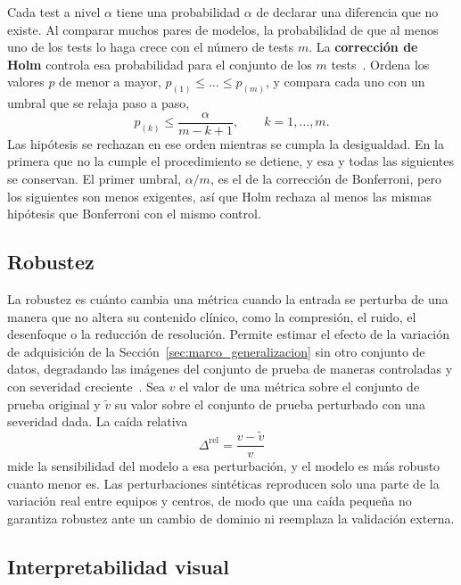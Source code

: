 Cada test a nivel $\alpha$ tiene una probabilidad $\alpha$ de declarar una diferencia que no existe. Al comparar
muchos pares de modelos, la probabilidad de que al menos uno de los tests lo haga crece con el número de tests
$m$. La \textbf{corrección de Holm} controla esa probabilidad para el conjunto de los $m$ tests~\cite{holm1979simple}. Ordena los valores $p$ de menor a mayor, $p_{(1)} \le \dots \le p_{(m)}$, y compara
cada uno con un umbral que se relaja paso a paso,
\begin{equation}
    p_{(k)} \le \frac{\alpha}{m - k + 1}, \qquad k = 1, \dots, m.
    \label{eq:marco_holm}
\end{equation}
Las hipótesis se rechazan en ese orden mientras se cumpla la desigualdad. En la primera que no la cumple el
procedimiento se detiene, y esa y todas las siguientes se conservan. El primer umbral, $\alpha/m$, es el de la
corrección de Bonferroni, pero los siguientes son menos exigentes, así que Holm rechaza al menos las mismas
hipótesis que Bonferroni con el mismo control.

\subsection{Robustez}
\label{sec:marco_eval_robustez}

La robustez es cuánto cambia una métrica cuando la entrada se perturba de una manera que no altera su contenido
clínico, como la compresión, el ruido, el desenfoque o la reducción de resolución. Permite estimar el efecto de la
variación de adquisición de la Sección~\ref{sec:marco_generalizacion} sin otro conjunto de datos, degradando las
imágenes del conjunto de prueba de maneras controladas y con severidad creciente~\cite{hendrycks2019benchmarking}. Sea $v$ el
valor de una métrica sobre el conjunto de prueba original y $\tilde{v}$ su valor sobre el conjunto de prueba perturbado con una severidad
dada. La caída relativa
\begin{equation}
    \Delta^{\text{rel}} = \frac{v - \tilde{v}}{v}
    \label{eq:marco_robustez}
\end{equation}
mide la sensibilidad del modelo a esa perturbación, y el modelo es más robusto cuanto menor es. Las perturbaciones
sintéticas reproducen solo una parte de la variación real entre equipos y centros, de modo que una caída pequeña
no garantiza robustez ante un cambio de dominio ni reemplaza la validación externa.

\subsection{Interpretabilidad visual}
\label{sec:marco_eval_gradcam}

